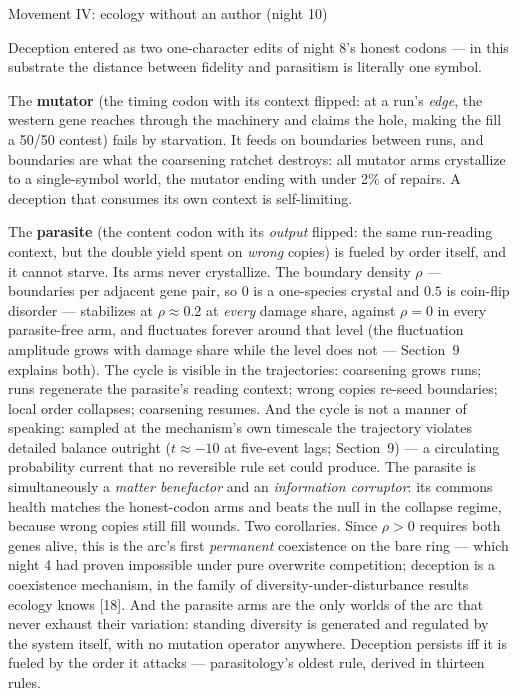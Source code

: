 \sec Movement IV: ecology without an author (night 10)

Deception entered as two one-character edits of night 8's honest
codons --- in this substrate the distance between fidelity and
parasitism is literally one symbol.

The {\bf mutator} (the timing codon with its context flipped: at a
run's {\it edge}, the western gene reaches through the machinery
and claims the hole, making the fill a 50/50 contest) fails by
starvation. It feeds on boundaries between runs, and boundaries
are what the coarsening ratchet destroys: all mutator arms
crystallize to a single-symbol world, the mutator ending with
under 2\% of repairs. A deception that consumes its own context is
self-limiting.

The {\bf parasite} (the content codon with its {\it output}
flipped: the same run-reading context, but the double yield spent
on {\it wrong} copies) is fueled by order itself, and it cannot
starve. Its arms never crystallize. The boundary density $\rho$
--- boundaries per adjacent gene pair, so $0$ is a one-species
crystal and $0.5$ is coin-flip disorder --- stabilizes at
$\rho\approx0.2$ at {\it every} damage share, against $\rho=0$ in
every parasite-free arm, and fluctuates forever around that level
(the fluctuation amplitude grows with damage share while the level
does not --- Section~9 explains both). The cycle is visible in the
trajectories: coarsening grows runs; runs regenerate the
parasite's reading context; wrong copies re-seed boundaries; local
order collapses; coarsening resumes. And the cycle is not a
manner of speaking: sampled at the mechanism's own timescale the
trajectory violates detailed balance outright ($t\approx-10$ at
five-event lags; Section~9) --- a circulating probability current
that no reversible rule set could produce. The parasite is
simultaneously a {\it matter benefactor} and an {\it information
corruptor}: its commons health matches the honest-codon arms and
beats the null in the collapse regime, because wrong copies still
fill wounds. Two corollaries. Since $\rho>0$ requires both genes
alive, this is the arc's first {\it permanent} coexistence on the
bare ring --- which night 4 had proven impossible under pure
overwrite competition; deception is a coexistence mechanism, in
the family of diversity-under-disturbance results ecology knows
[18]. And the parasite arms are the only worlds of the arc that
never exhaust their variation: standing diversity is generated and
regulated by the system itself, with no mutation operator
anywhere.  Deception persists iff it is fueled by the
order it attacks --- parasitology's oldest rule, derived in
thirteen rules.

